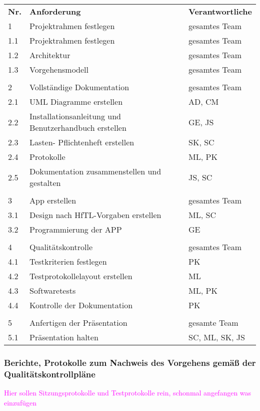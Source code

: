 \begin{tabular}{lll}
	\textbf{Nr.} & \textbf{Anforderung} & \textbf{Verantwortliche} \\
	1 & Projektrahmen festlegen & gesamtes Team \\
	1.1 & Projektrahmen festlegen & gesamtes Team \\
	1.2 & Architektur & gesamtes Team \\
	1.3 & Vorgehensmodell & gesamtes Team \\
	\\
	2 & Vollständige Dokumentation & gesamtes Team \\
	2.1 & UML Diagramme erstellen & AD, CM \\
	2.2 & Installationsanleitung und Benutzerhandbuch erstellen & GE, JS \\
	2.3 & Lasten- Pflichtenheft erstellen & SK, SC \\
	2.4 & Protokolle & ML, PK \\
	2.5 & Dokumentation zusammenstellen und gestalten & JS, SC \\
	\\
	3 & App erstellen & gesamtes Team \\
	3.1 & Design nach HfTL-Vorgaben erstellen & ML, SC \\
	3.2 & Programmierung der APP & GE \\	
	\\
	4 & Qualitätskontrolle & gesamtes Team \\
	4.1 & Testkriterien festlegen & PK \\
	4.2 & Testprotokollelayout erstellen & ML \\
	4.3 & Softwaretests & ML, PK \\
	4.4 & Kontrolle der Dokumentation & PK \\
	\\
	5 & Anfertigen der Präsentation & gesamte Team \\
	5.1 & Präsentation halten & SC, ML, SK, JS \\
\end{tabular}



\subsubsection{Berichte, Protokolle zum Nachweis des Vorgehens gemäß der Qualitätskontrollpläne}
\textcolor{magenta}{Hier sollen Sitzungsprotokolle und Testprotokolle rein, schonmal angefangen was einzufügen}

